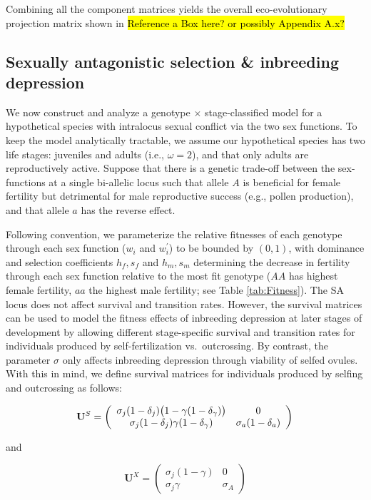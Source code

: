 \documentclass[11pt]{article}
\def\mbf#1{\mathbf{#1}}
\begin{document}
Combining all the component matrices yields the overall eco-evolutionary projection matrix shown in \hl{Reference a Box here?  or possibly Appendix A.x?}


\subsection*{Sexually antagonistic selection \& inbreeding depression} \label{sec:SAsel}

We now construct and analyze a genotype $\times$ stage-classified model for a hypothetical species with intralocus sexual conflict via the two sex functions. To keep the model analytically tractable, we assume our hypothetical species has two life stages: juveniles and adults (i.e., $\omega = 2$), and that only adults are reproductively active. Suppose that there is a genetic trade-off between the sex-functions at a single bi-allelic locus such that allele $A$ is beneficial for female fertility but detrimental for male reproductive success (e.g., pollen production), and that allele $a$ has the reverse effect. 

Following convention, we parameterize the relative fitnesses of each genotype through each sex function ($w_{i}$ and $w^{\prime}_{i}$) to be bounded by $(0,1)$, with dominance and selection coefficients $h_f, s_f$ and $h_m, s_m$ determining the decrease in fertility through each sex function relative to the most fit genotype ($AA$ has highest female fertility, $aa$ the highest male fertility; see Table \ref{tab:Fitness}). The SA locus does not affect survival and transition rates. However, the survival matrices can be used to model the fitness effects of inbreeding depression at later stages of development by allowing different stage-specific survival and transition rates for individuals produced by self-fertilization vs.~outcrossing. By contrast, the parameter $\sigma$ only affects inbreeding depression through viability of selfed ovules. With this in mind, we define survival matrices for individuals produced by selfing and outcrossing as follows:
\begin{linenomath*}
\begin{equation} \label{eq:US}
	\mbf{U}^S = \left(
					\begin{array}{cc}
						\sigma_j (1 - \delta_j) \big(1 - \gamma (1 - \delta_{\gamma}) \big) & 0 \\
						\sigma_j (1 - \delta_j) \gamma (1 - \delta_{\gamma})      & \sigma_a (1 - \delta_a)
					\end{array}
				\right) \\
\end{equation}
\end{linenomath*}
\noindent and 
\begin{linenomath*}
\begin{equation}\label{eq:UX}
	\mbf{U}^X = \left(
					\begin{array}{cc}
						\sigma_j(1 - \gamma) & 0 \\
						\sigma_j \gamma      & \sigma_A
					\end{array}
				\right)
\end{equation}
\end{linenomath*}
\end{document}
